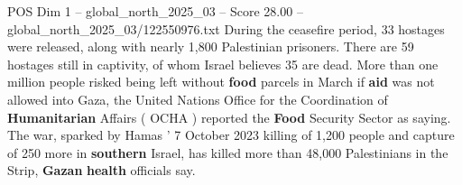 \begin{textsample}{POS Dim 1 – global\_north\_2025\_03 – Score 28.00 – global\_north\_2025\_03/122550976.txt}
During the ceasefire period, 33 hostages were released, along with nearly 1,800 Palestinian prisoners.
There are 59 hostages still in captivity, of whom Israel believes 35 are dead.
More than one million people risked being left without \textbf{food} parcels in March if \textbf{aid} was not allowed into Gaza, the United Nations Office for the Coordination of \textbf{Humanitarian} Affairs ( OCHA ) reported the \textbf{Food} Security Sector as saying.
The war, sparked by Hamas ' 7 October 2023 killing of 1,200 people and capture of 250 more in \textbf{southern} Israel, has killed more than 48,000 Palestinians in the Strip, \textbf{Gazan} \textbf{health} officials say.

\end{textsample}
